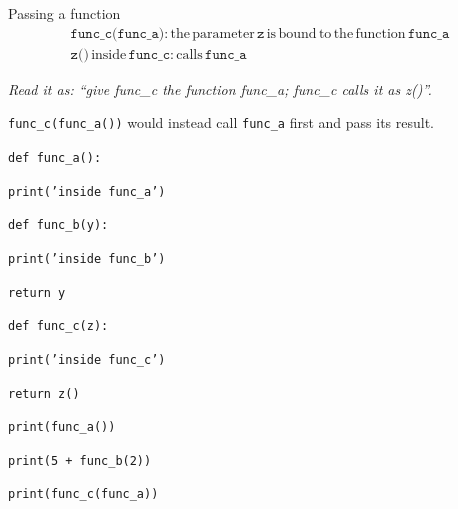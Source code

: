 \documentclass[11pt]{article}
\begin{document}
\begin{keepsection}
\begin{equationcard}{Passing a function}
\[ \begin{gathered} \texttt{func\_c(func\_a)}:\, \text{the}\, \text{parameter}\, \texttt{z}\, \text{is}\, \text{bound}\, \text{to}\, \text{the}\, \text{function}\, \texttt{func\_a} \\ \texttt{z()}\, \text{inside}\, \texttt{func\_c}:\, \text{calls}\, \texttt{func\_a} \end{gathered} \]
{\small \emph{Read it as: “give func\_c the function func\_a; func\_c calls it as z()”.}\par  \texttt{func\_c(func\_a())} would instead call \texttt{func\_a} first and pass its result.}
\end{equationcard}
\begin{tcolorbox}[colback=Paperblue,colframe=Paperblue,boxrule=0pt,arc=0pt,left=7pt,right=7pt,top=5pt,bottom=5pt]\small\sloppy
\noindent\hspace*{0em}\texttt{def func\_a():}\par
\noindent\hspace*{1em}\texttt{print('inside func\_a')}\par
\noindent\hspace*{0em}\texttt{}\par
\noindent\hspace*{0em}\texttt{def func\_b(y):}\par
\noindent\hspace*{1em}\texttt{print('inside func\_b')}\par
\noindent\hspace*{1em}\texttt{return y}\par
\noindent\hspace*{0em}\texttt{}\par
\noindent\hspace*{0em}\texttt{def func\_c(z):}\par
\noindent\hspace*{1em}\texttt{print('inside func\_c')}\par
\noindent\hspace*{1em}\texttt{return z()}\par
\noindent\hspace*{0em}\texttt{}\par
\noindent\hspace*{0em}\texttt{print(func\_a())}\par
\noindent\hspace*{0em}\texttt{print(5 + func\_b(2))}\par
\noindent\hspace*{0em}\texttt{print(func\_c(func\_a))}\par
\end{tcolorbox}


\end{keepsection}
\end{document}
